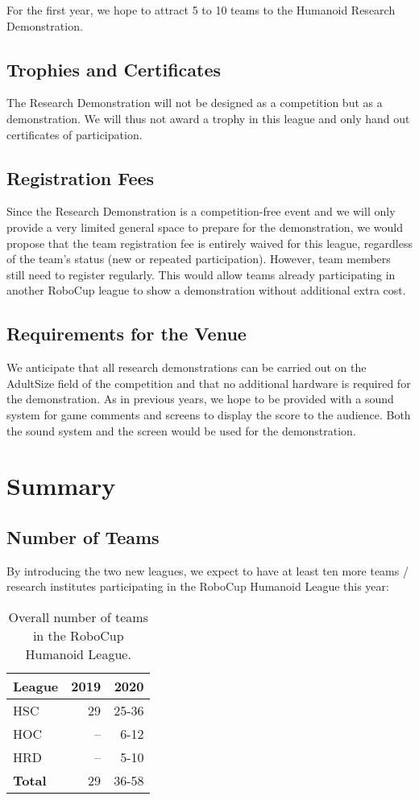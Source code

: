 \documentclass{article}
\begin{document}
For the first year, we hope to attract 5 to 10 teams to the Humanoid Research Demonstration.

\subsection{Trophies and Certificates}
The Research Demonstration will not be designed as a competition but as a demonstration. We will thus not award a trophy in this league and only hand out certificates of participation. 

\subsection{Registration Fees}

Since the Research Demonstration is a competition-free event and we will only provide a very limited general space to prepare for the demonstration, we would propose that the team registration fee is entirely waived for this league, regardless of the team's status (new or repeated participation). However, team members still need to register regularly. This would allow teams already participating in another RoboCup league to show a demonstration without additional extra cost. 

\subsection{Requirements for the Venue}

We anticipate that all research demonstrations can be carried out on the AdultSize field of the competition and that no additional hardware is required for the demonstration. As in previous years, we hope to be provided with a sound system for game comments and screens to display the score to the audience. Both the sound system and the screen would be used for the demonstration.
 
\section{Summary}

\subsection{Number of Teams}
By introducing the two new leagues, we expect to have at least ten more teams / research institutes participating in the RoboCup Humanoid League this year:

\begin{table}[h]
  \centering
  \begin{tabular}{l | r | r}
    League & 2019 & 2020\\
    \hline
    HSC & 29 & 25-36\\ 
    HOC & -- & 6-12\\
    HRD & -- & 5-10\\
    \hline
    \textbf{Total} & 29 & 36-58
  \end{tabular}
  \caption{Overall number of teams in the RoboCup Humanoid League.}

\end{table}
\end{document}
